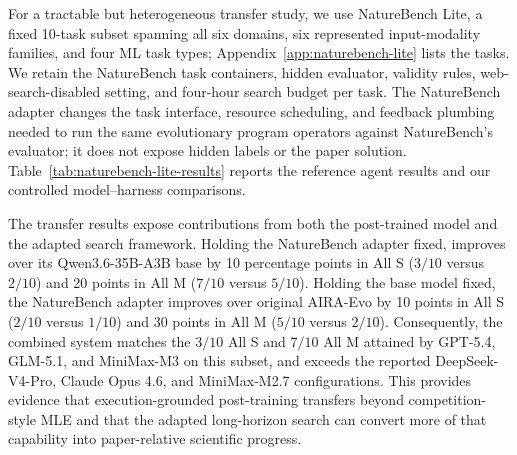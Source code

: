 For a tractable but heterogeneous transfer study, we use NatureBench Lite, a fixed 10-task subset spanning all six domains, six represented input-modality families, and four ML task types; Appendix~\ref{app:naturebench-lite} lists the tasks.
We retain the NatureBench task containers, hidden evaluator, validity rules, web-search-disabled setting, and four-hour search budget per task.
The \openmleevo{} NatureBench adapter changes the task interface, resource scheduling, and feedback plumbing needed to run the same evolutionary program operators against NatureBench's evaluator; it does not expose hidden labels or the paper solution.
Table~\ref{tab:naturebench-lite-results} reports the reference agent results and our controlled model--harness comparisons.


The transfer results expose contributions from both the post-trained model and the adapted search framework.
Holding the NatureBench adapter fixed, \thirtyfivebmodel{} improves over its Qwen3.6-35B-A3B base by 10 percentage points in All S ($3/10$ versus $2/10$) and 20 points in All M ($7/10$ versus $5/10$).
Holding the base model fixed, the \openmleevo{} NatureBench adapter improves over original AIRA-Evo by 10 points in All S ($2/10$ versus $1/10$) and 30 points in All M ($5/10$ versus $2/10$).
Consequently, the combined \thirtyfivebmodel{} system matches the $3/10$ All S and $7/10$ All M attained by GPT-5.4, GLM-5.1, and MiniMax-M3 on this subset, and exceeds the reported DeepSeek-V4-Pro, Claude Opus 4.6, and MiniMax-M2.7 configurations.
This provides evidence that execution-grounded post-training transfers beyond competition-style MLE and that the adapted long-horizon search can convert more of that capability into paper-relative scientific progress.

